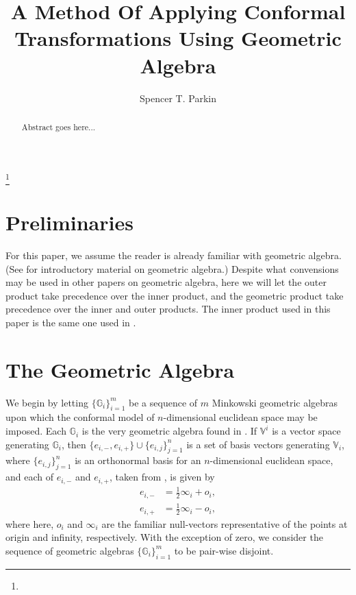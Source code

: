\documentclass{ecgd-l}
\theoremstyle{definition}
\theoremstyle{remark}
\numberwithin{equation}{section}
\newcommand{\G}{\mathbb{G}}
\newcommand{\V}{\mathbb{V}}
\newcommand{\nvai}{\infty}
\newcommand{\nvao}{o}
\begin{document}
\title{A Method Of Applying Conformal Transformations Using Geometric Algebra}


\author{Spencer T. Parkin}
\address{Put Address Here}
\curraddr{}
\email{}
\thanks{}


\date{}

\dedicatory{}

\begin{abstract}
Abstract goes here...
\end{abstract}

\maketitle

\section{Preliminaries}

For this paper, we assume the reader is already familiar with geometric algebra.
(See \cite{} for introductory material on geometric algebra.)  Despite what convensions
may be used in other papers on geometric algebra, here we will let the outer product
take precedence over the inner product, and the geometric product take precedence
over the inner and outer products.  The inner product used in this paper is the
same one used in \cite{}.

\section{The Geometric Algebra}

We begin by letting $\{\G_i\}_{i=1}^m$ be a sequence of $m$ Minkowski geometric algebras upon
which the conformal model of $n$-dimensional euclidean space may be imposed.
Each $\G_i$ is the very geometric algebra found in \cite{}.  If $\V^i$ is a vector space
generating $\G_i$, then $\{e_{i,-},e_{i,+}\}\cup\{e_{i,j}\}_{j=1}^n$ is a set of basis
vectors generating $\V_i$, where $\{e_{i,j}\}_{j=1}^n$ is an orthonormal basis
for an $n$-dimensional euclidean space, and each of $e_{i,-}$ and $e_{i,+}$, taken from \cite{}, is given by
\begin{align*}
e_{i,-} &= \frac{1}{2}\nvai_i + \nvao_i, \\
e_{i,+} &= \frac{1}{2}\nvai_i - \nvao_i,
\end{align*}
where here, $\nvao_i$ and $\nvai_i$ are the familiar null-vectors
representative of the points at origin and infinity, respectively.
With the exception of zero, we consider the sequence of geometric algebras $\{\G_i\}_{i=1}^m$
to be pair-wise disjoint.
\end{document}

